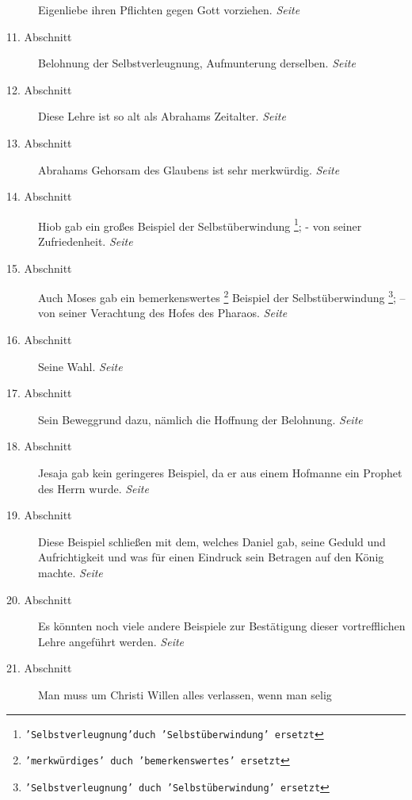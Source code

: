 \begin{description}
Eigenliebe ihren Pflichten gegen Gott vorziehen.
\dotfill \textit{Seite~\pageref{kap4_ab10}}\\
\item[11. Abschnitt] Belohnung der Selbstverleugnung, Aufmunterung derselben.
\dotfill \textit{Seite~\pageref{kap4_ab11}}\\
\item[12. Abschnitt] Diese Lehre ist so alt als Abrahams Zeitalter.
\dotfill \textit{Seite~\pageref{kap4_ab12}}\\
\item[13. Abschnitt] Abrahams Gehorsam des Glaubens ist sehr merkwürdig.
\dotfill \textit{Seite~\pageref{kap4_ab13}}\\
\item[14. Abschnitt] Hiob gab ein großes Beispiel der Selbstüberwindung
\footnote{\texttt{'Selbstverleugnung'duch 'Selbstüberwindung' ersetzt}}; - von
seiner Zufriedenheit.
\dotfill \textit{Seite~\pageref{kap4_ab14}}\\
\item[15. Abschnitt] Auch Moses gab ein bemerkenswertes
\footnote{\texttt{'merkwürdiges' duch 'bemerkenswertes' ersetzt}} Beispiel der
Selbstüberwindung \footnote{\texttt{'Selbstverleugnung' duch 'Selbstüberwindung'
ersetzt}}; -- von seiner Verachtung des Hofes des Pharaos.
\dotfill \textit{Seite~\pageref{kap4_ab15}}\\
\item[16. Abschnitt] Seine Wahl.
\dotfill \textit{Seite~\pageref{kap4_ab16}}\\
\item[17. Abschnitt] Sein Beweggrund dazu, nämlich die Hoffnung der Belohnung.
\dotfill \textit{Seite~\pageref{kap4_ab17}}\\
\item[18. Abschnitt] Jesaja gab kein geringeres Beispiel, da er aus einem
Hofmanne ein Prophet des Herrn wurde.
\dotfill \textit{Seite~\pageref{kap4_ab18}}\\
\item[19. Abschnitt] Diese Beispiel schließen mit dem, welches Daniel gab,
seine Geduld und Aufrichtigkeit und was für einen Eindruck sein Betragen auf
den König machte.
\dotfill \textit{Seite~\pageref{kap4_ab19}}\\
\item[20. Abschnitt] Es könnten noch viele andere Beispiele zur Bestätigung
dieser vortrefflichen Lehre angeführt werden.
\dotfill \textit{Seite~\pageref{kap4_ab20}}\\
\item[21. Abschnitt] Man muss um Christi Willen alles verlassen, wenn man selig

\end{description}
